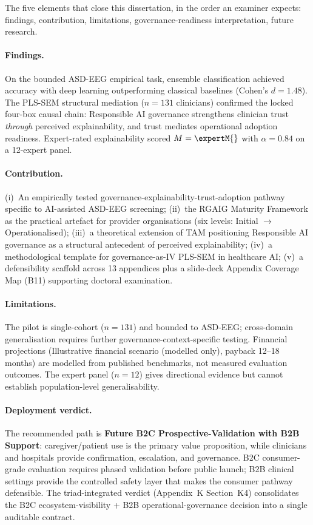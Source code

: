\noindent The five elements that close this dissertation, in the order an examiner expects: findings, contribution, limitations, governance-readiness interpretation, future research.

\paragraph{Findings.} On the bounded ASD-EEG empirical task, ensemble classification achieved \asdacc{} accuracy with deep learning outperforming classical baselines (Cohen's $d=1.48$). The PLS-SEM structural mediation ($n=131$ clinicians) confirmed the locked four-box causal chain: Responsible AI governance strengthens clinician trust \emph{through} perceived explainability, and trust mediates operational adoption readiness. Expert-rated explainability scored $M = \expertM{}$ with $\alpha=0.84$ on a 12-expert panel.

\paragraph{Contribution.} (i)~An empirically tested governance-explainability-trust-adoption pathway specific to AI-assisted ASD-EEG screening; (ii)~the RGAIG Maturity Framework as the practical artefact for provider organisations (six levels: Initial $\to$ Operationalised); (iii)~a theoretical extension of TAM \cite{davis1989tam} positioning Responsible AI governance as a structural antecedent of perceived explainability; (iv)~a methodological template for governance-as-IV PLS-SEM in healthcare AI; (v)~a defensibility scaffold across 13 appendices plus a slide-deck Appendix Coverage Map (B11) supporting doctoral examination.

\paragraph{Limitations.} The pilot is single-cohort ($n=131$) and bounded to ASD-EEG; cross-domain generalisation requires further governance-context-specific testing. Financial projections (Illustrative financial scenario (modelled only), payback 12--18 months) are modelled from published benchmarks, not measured evaluation outcomes. The expert panel ($n=12$) gives directional evidence but cannot establish population-level generalisability.

\paragraph{Deployment verdict.} The recommended path is \textbf{Future B2C Prospective-Validation with B2B Support}: caregiver/patient use is the primary value proposition, while clinicians and hospitals provide confirmation, escalation, and governance. B2C consumer-grade evaluation requires phased validation before public launch; B2B clinical settings provide the controlled safety layer that makes the consumer pathway defensible. The triad-integrated verdict (Appendix~K Section~K4) consolidates the B2C ecosystem-visibility + B2B operational-governance decision into a single auditable contract.

